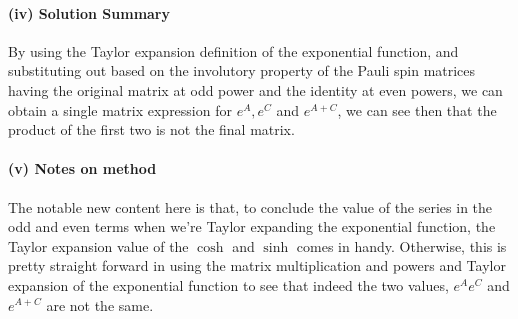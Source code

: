 \documentclass{article}
\begin{document}
\paragraph{(iv) Solution Summary} By using the Taylor expansion definition of the exponential function, and substituting out based on the involutory property of the Pauli spin matrices having the original matrix at odd power and the identity at even powers, we can obtain a single matrix expression for $e^A, e^C$ and $e^{A+C}$, we can see then that the product of the first two is not the final matrix.

\paragraph{(v) Notes on method} The notable new content here is that, to conclude the value of the series in the odd and even terms when we're Taylor expanding the exponential function, the Taylor expansion value of the $\cosh$ and $\sinh$ comes in handy. Otherwise, this is pretty straight forward in using the matrix multiplication and powers and Taylor expansion of the exponential function to see that indeed the two values, $e^Ae^C$ and $e^{A+C}$ are not the same.
\end{document}
